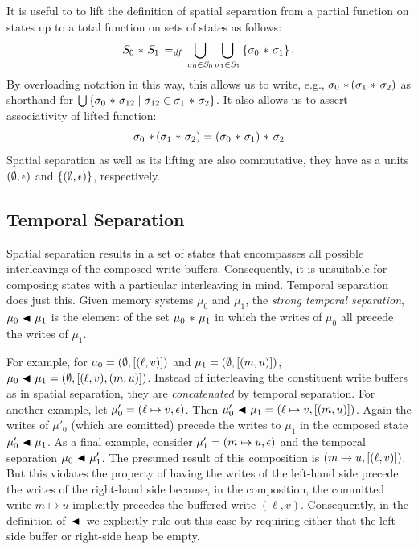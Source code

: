 \documentclass[11pt]{report}
\begin{document}
It is useful to to lift the definition of spatial separation from a partial function on states up to a total function on sets of states as follows: \[ S_0 \operatorname{\,\ast\,} S_1 \operatorname{\;=_{\mathit{df}}\;} \bigcup_{\sigma_0 \in S_0} \bigcup_{\sigma_1 \in S_1} \left\lbrace \sigma_0 \operatorname{\,\ast\,} \sigma_1 \right\rbrace.\] By overloading notation in this way, this allows us to write, e.g., $\sigma_0 \operatorname{\,\ast\,} (\sigma_1 \operatorname{\,\ast\,} \sigma_2)$ as shorthand for $\bigcup \left\lbrace \sigma_0 \operatorname{\,\ast\,} \sigma_{12} \mid \sigma_{12} \in \sigma_1 \operatorname{\,\ast\,} \sigma_2 \right\rbrace$. It also allows us to assert associativity of lifted function: \[ \sigma_0 \operatorname{\,\ast\,} (\sigma_1 \operatorname{\,\ast\,} \sigma_2) = (\sigma_0 \operatorname{\,\ast\,} \sigma_1) \operatorname{\,\ast\,} \sigma_2 \] Spatial separation as well as its lifting are also commutative, they have as a units $(\operatorname{\emptyset},\epsilon)$ and $\left\lbrace (\operatorname{\emptyset},\epsilon) \right\rbrace$, respectively. 

\subsection{Temporal Separation}
\label{sec:sequential-temporal-separation}

Spatial separation results in a set of states that encompasses all possible interleavings of the composed write buffers. Consequently, it is unsuitable for composing states with a particular interleaving in mind. Temporal separation does just this. Given memory systems $\mu_0$ and $\mu_1$, the \emph{strong temporal separation}, $\mu_0 \operatorname{\,\blacktriangleleft\,} \mu_1$ is the element of the set $\mu_0 \operatorname{\,\ast\,} \mu_1$ in which the writes of $\mu_0$ all precede the writes of $\mu_1$. 

For example, for $\mu_0 = (\operatorname{\emptyset},\left[(\ell,v)\right])$ and $\mu_1 = (\operatorname{\emptyset},\left[(m,u)\right])$, $\mu_0 \operatorname{\,\blacktriangleleft\,} \mu_1 = (\operatorname{\emptyset},\left[(\ell,v),(m,u)\right])$. Instead of interleaving the constituent write buffers as in spatial separation, they are \emph{concatenated} by temporal separation. For another example, let $\mu'_0 = (\ell \mapsto v, \epsilon)$. Then $\mu'_0 \operatorname{\,\blacktriangleleft\,} \mu_1 = (\ell \mapsto v, \left[(m,u)\right])$. Again the writes of $\mu'_0$ (which are comitted) precede the writes to $\mu_1$ in the composed state $\mu'_0 \operatorname{\,\blacktriangleleft\,} \mu_1$. As a final example, consider $\mu'_1 = (m \mapsto u, \epsilon)$ and the temporal separation $\mu_0 \operatorname{\,\blacktriangleleft\,} \mu'_1$. The presumed result of this composition is $(m \mapsto u, \left[(\ell,v)\right])$. But this violates the property of having the writes of the left-hand side precede the writes of the right-hand side because, in the composition, the committed write $m \mapsto u$ implicitly precedes the buffered write $(\ell,v)$. Consequently, in the definition of $\operatorname{\,\blacktriangleleft\,}$ we explicitly rule out this case by requiring either that the left-side buffer or right-side heap be empty. 
\end{document}
